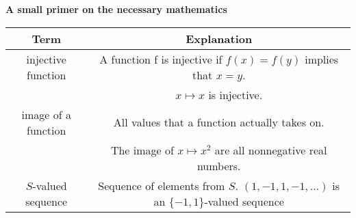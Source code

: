 \documentclass[a4paper,11pt]{article}
\theoremstyle{mytheor}
\begin{document}
\begin{center}
    \textbf{A small primer on the necessary mathematics}\\
    \begin{tabular}{c c}
        Term & Explanation\\
        \hline
        injective function & A function f is injective if $f(x) = f(y)$ implies that $x = y$. \\
        & $x \mapsto x$ is injective. \\
        image of a function & All values that a function actually takes on. \\
        & The image of $x \mapsto x^2$ are all nonnegative real numbers. \\
        $S$-valued sequence & Sequence of elements from $S$. $(1,-1,1,-1,...)$ is an $\{-1, 1\}$-valued sequence \\

    \end{tabular}
\end{center}
\end{document}
